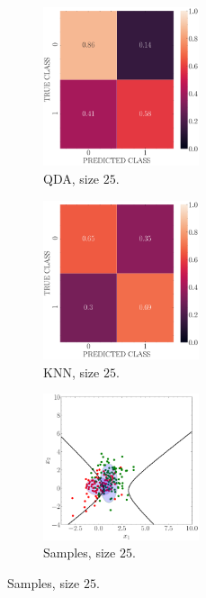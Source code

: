 \documentclass[12pt, a4 paper]{article}
\begin{document}
\begin{figure}[!htbp]
\quad \quad 
    \begin{subfigure}[!htbp]{0.24\textwidth}
       \centering
       \includegraphics[width=1.8in]{../results/ex1/conf_mtx_QD_ML_dataset_P1a_size_25.pdf}
       \caption{QDA, size $25$.}
       \label{fig:QDA_P1a_25}
    \end{subfigure}
\quad \quad 
    \begin{subfigure}[!htbp]{0.24\textwidth}
       \centering
       \includegraphics[width=1.8in]{../results/ex1/conf_mtx_KNN_dataset_P1a_size_25.pdf}
       \caption{KNN, size $25$.}
       \label{fig:KNN_P1a_25}
    \end{subfigure}
\quad \quad
    \begin{subfigure}[!htbp]{0.24\textwidth}
       \centering
       \includegraphics[width=1.8in]{../results/ex1/samples_QD_ML_dataset_P1a_size_25.pdf}
       \caption{Samples, size $25$.}
       \label{fig:DF_P1a_25}
    \end{subfigure}
    

\end{figure}
\end{document}
